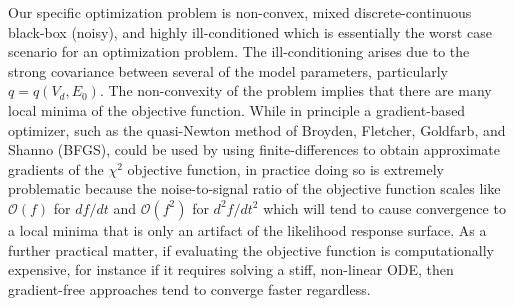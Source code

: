 \documentclass[12pt,a4paper,oneside]{book}
\begin{document}
Our specific optimization problem is non-convex, mixed discrete-continuous black-box (noisy), and highly ill-conditioned which is essentially the worst case scenario for an optimization problem. The ill-conditioning arises due to the strong covariance between several of the model parameters, particularly $q=q(V_d, E_0)$. The non-convexity of the problem implies that there are many local minima of the objective function. While in principle a gradient-based optimizer, such as the quasi-Newton method of Broyden, Fletcher, Goldfarb, and Shanno (BFGS)\cite{nocedal_numerical_2006}, could be used by using finite-differences to obtain approximate gradients of the $\chi^2$ objective function, in practice doing so is extremely problematic because the noise-to-signal ratio of the objective function scales like $\mathcal{O}(f)$ for $df/dt$ and $\mathcal{O}(f^2)$ for $d^2f/dt^2$ which will tend to cause convergence to a local minima that is only an artifact of the likelihood response surface\cite{wood_data_1982}. As a further practical matter, if evaluating the objective function is computationally expensive, for instance if it requires solving a stiff, non-linear ODE, then gradient-free approaches tend to converge faster regardless\cite{kolda_optimization_2003}.
 
\end{document}
